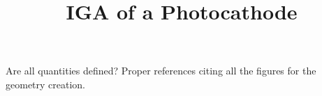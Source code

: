 \documentclass[10pt,a4paper]{article}
\begin{document}
\title{IGA of a Photocathode}
\date{}
\author{}
\maketitle

Are all quantities defined?
Proper references citing all the figures for the geometry creation.


% 

\clearpage
{}

\end{document}
